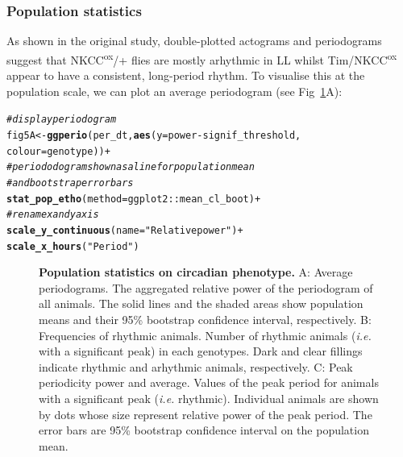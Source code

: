 \documentclass[10pt,letterpaper]{article}\usepackage[]{graphicx}\usepackage[]{color}
\makeatletter
\newcommand{\hlstr}[1]{\textcolor[rgb]{0.192,0.494,0.8}{#1}}%
\newcommand{\hlcom}[1]{\textcolor[rgb]{0.678,0.584,0.686}{\textit{#1}}}%
\newcommand{\hlopt}[1]{\textcolor[rgb]{0,0,0}{#1}}%
\newcommand{\hlstd}[1]{\textcolor[rgb]{0.345,0.345,0.345}{#1}}%
\newcommand{\hlkwb}[1]{\textcolor[rgb]{0.69,0.353,0.396}{#1}}%
\newcommand{\hlkwc}[1]{\textcolor[rgb]{0.333,0.667,0.333}{#1}}%
\newcommand{\hlkwd}[1]{\textcolor[rgb]{0.737,0.353,0.396}{\textbf{#1}}}%
\newenvironment{kframe}{%
 \def\at@end@of@kframe{}%
 \ifinner\ifhmode%
  \def\at@end@of@kframe{\end{minipage}}%
  \begin{minipage}{\columnwidth}%
 \fi\fi%
 \def\FrameCommand##1{\hskip\@totalleftmargin \hskip-\fboxsep
 \colorbox{shadecolor}{##1}\hskip-\fboxsep
     \hskip-\linewidth \hskip-\@totalleftmargin \hskip\columnwidth}%
 \MakeFramed {\advance\hsize-\width
   \@totalleftmargin\z@ \linewidth\hsize
   \@setminipage}}%
 {\par\unskip\endMakeFramed%
 \at@end@of@kframe}
\newenvironment{knitrout}{}{} %
\makeatother
\begin{document}
\subsubsection*{Population statistics}

As shown in the original study, double-plotted actograms and periodograms suggest that NKCC\textsuperscript{ox}/+ flies are mostly 
arhythmic in LL whilst Tim/NKCC\textsuperscript{ox} appear to have a consistent, long-period rhythm.
To visualise this at the population scale, we can plot an average periodogram (see Fig~\ref{fig:fig-5}A):

\begin{knitrout}
\color{fgcolor}\begin{kframe}
\begin{alltt}
\hlcom{# display periodogram }
\hlstd{fig5A} \hlkwb{<-} \hlkwd{ggperio}\hlstd{(per_dt,} \hlkwd{aes}\hlstd{(}\hlkwc{y} \hlstd{= power} \hlopt{-} \hlstd{signif_threshold,}
                             \hlkwc{colour} \hlstd{= genotype))} \hlopt{+}
          \hlcom{# periododogram shown as a line for population mean}
          \hlcom{# and bootstrap error bars}
          \hlkwd{stat_pop_etho}\hlstd{(}\hlkwc{method} \hlstd{= ggplot2}\hlopt{::}\hlstd{mean_cl_boot)} \hlopt{+}
          \hlcom{# rename x and y axis }
          \hlkwd{scale_y_continuous}\hlstd{(}\hlkwc{name} \hlstd{=} \hlstr{"Relative power"}\hlstd{)} \hlopt{+}
          \hlkwd{scale_x_hours}\hlstd{(}\hlstr{"Period"}\hlstd{)}
\end{alltt}
\end{kframe}
\end{knitrout}



\begin{figure}[!h]
	\caption{{\bf Population statistics on circadian phenotype.}
			A: Average periodograms. 
			      The aggregated relative power of the periodogram of all animals.
			      The solid lines and the shaded areas show population means and their 95\% bootstrap confidence interval, respectively.
			B: Frequencies of rhythmic animals.
			      Number of rhythmic animals (\emph{i.e.} with a significant peak) in each genotypes.
			      Dark and clear fillings indicate rhythmic and arhythmic animals, respectively.
      C: Peak periodicity power and average.
			      Values of the peak period for animals with a significant peak (\emph{i.e.} rhythmic).
			      Individual animals are shown by dots whose size represent relative power of the peak period.
			      The error bars are 95\% bootstrap confidence interval on the population mean.
			      }
	\label{fig:fig-5}
\end{figure}
\end{document}
